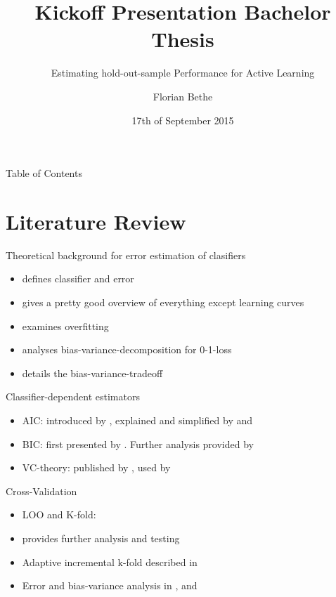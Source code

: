 \documentclass{beamer}
\title{Kickoff Presentation Bachelor Thesis}
\subtitle{Estimating hold-out-sample Performance for Active Learning}
\author{Florian Bethe}
\date{17th of September 2015}
\institute{OvGU Magdeburg - Department of Computer Science}
\begin{document}
	\begin{frame}
		\titlepage
	\end{frame}
	\begin{frame}{Table of Contents}
		\tableofcontents
	\end{frame}
	
\section{Literature Review}
\begin{frame}{Theoretical background for error estimation of clasifiers}
	\begin{itemize}
		\item \cite{RodriguezEtAl2013} defines classifier and error
		\item \cite{HastieEtAl2009} gives a pretty good overview of everything except learning curves
		\item \cite{Dietterich1995} examines overfitting
		\item \cite{KohaviEtAl1996} analyses bias-variance-decomposition for 0-1-loss
		\item \cite{KroghVedelsby1995} details the bias-variance-tradeoff
	\end{itemize}
\end{frame}
\begin{frame}{Classifier-dependent estimators}
	\begin{itemize}
		\item AIC: introduced by \cite{Akaike1998}, explained and simplified by \cite{Bozdogan1987} and \cite{HastieEtAl2009}
		\item BIC: first presented by \cite{Schwarz1978}. Further analysis provided by \cite{Weakliem1999}
		\item VC-theory: published by \cite{Vapnik1982}, used by \cite{BrumenEtal2004}
	\end{itemize}
\end{frame}
\begin{frame}{Cross-Validation}
	\begin{itemize}
		\item LOO and K-fold: \cite{Kohavi1995}
		\item \cite{PahikkalaEtAl2008} provides further analysis and testing
		\item Adaptive incremental k-fold described in \cite{BrumenEtal2004}
		\item Error and bias-variance analysis in \cite{AirolaEtAl2001}, \cite{RodriguezEtAl2013} and \cite{EfronEtAl1997}
	\end{itemize}
\end{frame}
\end{document}
